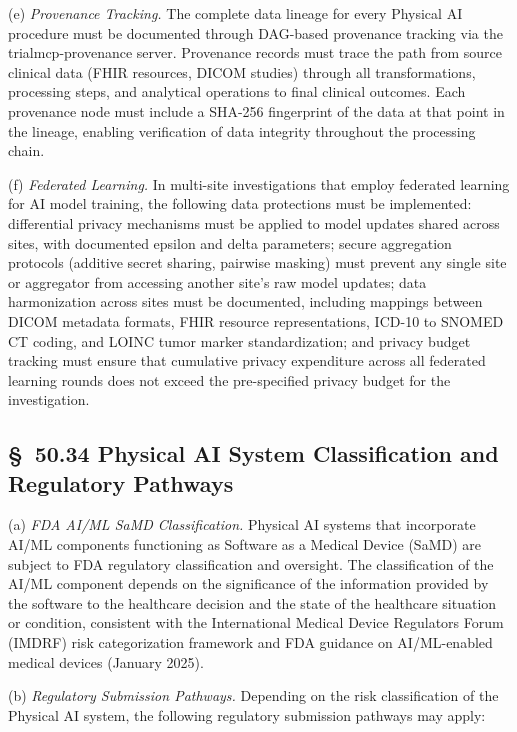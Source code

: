 (e) \textit{Provenance Tracking.} The complete data lineage for every Physical AI procedure must be documented through DAG-based provenance tracking via the trialmcp-provenance server. Provenance records must trace the path from source clinical data (FHIR resources, DICOM studies) through all transformations, processing steps, and analytical operations to final clinical outcomes. Each provenance node must include a SHA-256 fingerprint of the data at that point in the lineage, enabling verification of data integrity throughout the processing chain.

(f) \textit{Federated Learning.} In multi-site investigations that employ federated learning for AI model training, the following data protections must be implemented: differential privacy mechanisms must be applied to model updates shared across sites, with documented epsilon and delta parameters; secure aggregation protocols (additive secret sharing, pairwise masking) must prevent any single site or aggregator from accessing another site's raw model updates; data harmonization across sites must be documented, including mappings between DICOM metadata formats, FHIR resource representations, ICD-10 to SNOMED CT coding, and LOINC tumor marker standardization; and privacy budget tracking must ensure that cumulative privacy expenditure across all federated learning rounds does not exceed the pre-specified privacy budget for the investigation.

\subsection{\S~50.34 Physical AI System Classification and Regulatory Pathways}

(a) \textit{FDA AI/ML SaMD Classification.} Physical AI systems that incorporate AI/ML components functioning as Software as a Medical Device (SaMD) are subject to FDA regulatory classification and oversight. The classification of the AI/ML component depends on the significance of the information provided by the software to the healthcare decision and the state of the healthcare situation or condition, consistent with the International Medical Device Regulators Forum (IMDRF) risk categorization framework and FDA guidance on AI/ML-enabled medical devices (January 2025).

(b) \textit{Regulatory Submission Pathways.} Depending on the risk classification of the Physical AI system, the following regulatory submission pathways may apply:

